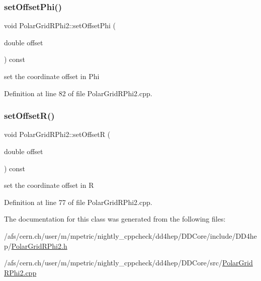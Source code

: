 \subsubsection{\texorpdfstring{set\+Offset\+Phi()}{setOffsetPhi()}}
{\footnotesize\ttfamily void Polar\+Grid\+R\+Phi2\+::set\+Offset\+Phi (\begin{DoxyParamCaption}\item[{double}]{offset }\end{DoxyParamCaption}) const}



set the coordinate offset in Phi 



Definition at line 82 of file Polar\+Grid\+R\+Phi2.\+cpp.

\hypertarget{class_d_d4hep_1_1_geometry_1_1_polar_grid_r_phi2_a4f2c42e6ddefc2eb08d097caf2f038f6}{}\label{class_d_d4hep_1_1_geometry_1_1_polar_grid_r_phi2_a4f2c42e6ddefc2eb08d097caf2f038f6} 
\subsubsection{\texorpdfstring{set\+Offset\+R()}{setOffsetR()}}
{\footnotesize\ttfamily void Polar\+Grid\+R\+Phi2\+::set\+OffsetR (\begin{DoxyParamCaption}\item[{double}]{offset }\end{DoxyParamCaption}) const}



set the coordinate offset in R 



Definition at line 77 of file Polar\+Grid\+R\+Phi2.\+cpp.



The documentation for this class was generated from the following files\+:\begin{DoxyCompactItemize}
\item 
/afs/cern.\+ch/user/m/mpetric/nightly\+\_\+cppcheck/dd4hep/\+D\+D\+Core/include/\+D\+D4hep/\hyperlink{_d_d_core_2include_2_d_d4hep_2_polar_grid_r_phi2_8h}{Polar\+Grid\+R\+Phi2.\+h}\item 
/afs/cern.\+ch/user/m/mpetric/nightly\+\_\+cppcheck/dd4hep/\+D\+D\+Core/src/\hyperlink{_d_d_core_2src_2_polar_grid_r_phi2_8cpp}{Polar\+Grid\+R\+Phi2.\+cpp}\end{DoxyCompactItemize}
